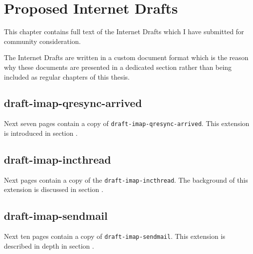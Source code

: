 \documentclass[trojita]{subfiles}
\begin{document}
\chapter{Proposed Internet Drafts}
\label{sec:id-manuscripts}

This chapter contains full text of the Internet Drafts which I have submitted for community consideration.

The Internet Drafts are written in a custom document format which is the reason why these documents are presented in a
dedicated section rather than being included as regular chapters of this thesis.

\section{draft-imap-qresync-arrived}
\label{sec:draft-imap-qresync-arrived}

Next seven pages contain a copy of {\tt draft-imap-qresync-arrived}.  This extension is introduced in section
.



\section{draft-imap-incthread}
\label{sec:draft-imap-incthread}

Next  pages contain a copy of the {\tt draft-imap-incthread}.  The background of this extension is
discussed in section .


\section{draft-imap-sendmail}
\label{sec:draft-imap-sendmail}

Next ten pages contain a copy of {\tt draft-imap-sendmail}.  This extension is described in depth in section
.


\end{document}
